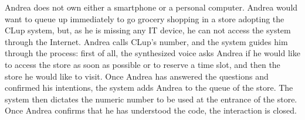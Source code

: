 \documentclass[../../main.tex]{subfiles}
\begin{document}
    Andrea does not own either a smartphone or a personal computer. 
    Andrea would want to queue up immediately to go grocery shopping in a store adopting the CLup system, 
    but, as he is missing any IT device, he can not access the system through the Internet. 
    Andrea calls CLup's number, and the system guides him through the process: first of all, 
    the synthesized voice asks Andrea if he would like to access the store as soon as possible or to reserve a time slot, 
    and then the store he would like to visit. Once Andrea has answered the questions and confirmed his intentions, 
    the system adds Andrea to the queue of the store. The system then dictates the numeric number to be used at the entrance of the store. 
    Once Andrea confirms that he has understood the code, the interaction is closed.
\end{document}
